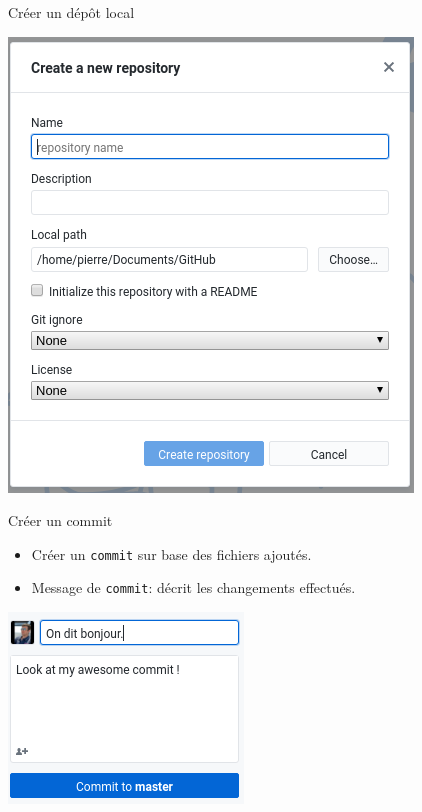 \documentclass{beamer}
\begin{document}
\begin{frame}{Créer un dépôt local}
    \begin{center}
        \includegraphics[scale=0.45]{img/new_repo.png}
    \end{center}
\end{frame}

\begin{frame}{Créer un commit}
\begin{itemize}
    \item Créer un \texttt{commit} sur base des fichiers ajoutés.
    \item Message de \texttt{commit}: décrit les changements effectués.
\end{itemize}
\begin{center}
    \includegraphics[width=.5\textwidth]{img/github_desktop/commit.png}
\end{center}
\end{frame}
\end{document}
